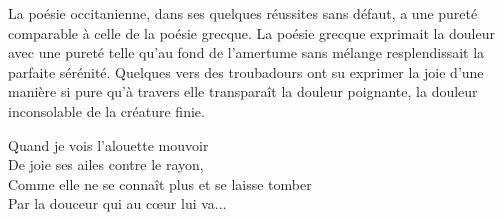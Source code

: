\documentclass[french,twoside]{book} %
\newenvironment{quoteblock}%
  {\begin{quoting}}
  {\end{quoting}}
\newenvironment{quotebar}{%
    \def\FrameCommand{{\color{rubric!10!}\vrule width 0.5em} \hspace{0.9em}}%
    \def\OuterFrameSep{\itemsep} %
    \MakeFramed {\advance\hsize-\width \FrameRestore}
  }%
  {%
    \endMakeFramed
  }
\renewenvironment{quoteblock}%
  {%
    \savenotes
    \setstretch{0.9}
    \normalfont
    \begin{quotebar}
  }
  {%
    \end{quotebar}
    \spewnotes
  }
\begin{document}
La poésie occitanienne, dans ses quelques réussites sans défaut, a une pureté comparable à celle de la poésie grecque. La poésie grecque exprimait la douleur avec une pureté telle qu'au fond de l'amertume sans mélange resplen­dissait la parfaite sérénité. Quelques vers des troubadours ont su exprimer la joie d'une manière si pure qu'à travers elle transparaît la douleur poignante, la douleur inconsolable de la créature finie.\par

\begin{quoteblock}
 \noindent Quand je vois l’alouette mouvoir \\
De joie ses ailes contre le rayon, \\
Comme elle ne se connaît plus et se laisse tomber \\
Par la douceur qui au cœur lui va...
 \end{quoteblock}
\end{document}
